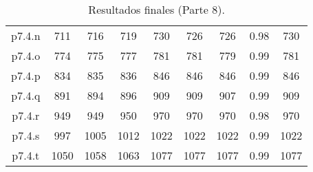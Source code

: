 \begin{table}
\begin{center}
\begin{tabular}{ |c|c|c|c|c|c|c|c|c| }
p7.4.n & 711 & 716 & 719 & 730 & 726 & 726 & 0.98 & 730 \\
p7.4.o & 774 & 775 & 777 & 781 & 781 & 779 & 0.99 & 781 \\
p7.4.p & 834 & 835 & 836 & 846 & 846 & 846 & 0.99 & 846 \\
p7.4.q & 891 & 894 & 896 & 909 & 909 & 907 & 0.99 & 909 \\
p7.4.r & 949 & 949 & 950 & 970 & 970 & 970 & 0.98 & 970 \\
p7.4.s & 997 & 1005 & 1012 & 1022 & 1022 & 1022 & 0.99 & 1022 \\
p7.4.t & 1050 & 1058 & 1063 & 1077 & 1077 & 1077 & 0.99 & 1077 \\
\hline
\end{tabular}
\end{center}
\caption{Resultados finales (Parte 8).}
\label{tab:resultadosFinales8}
\end{table}

\bigskip




